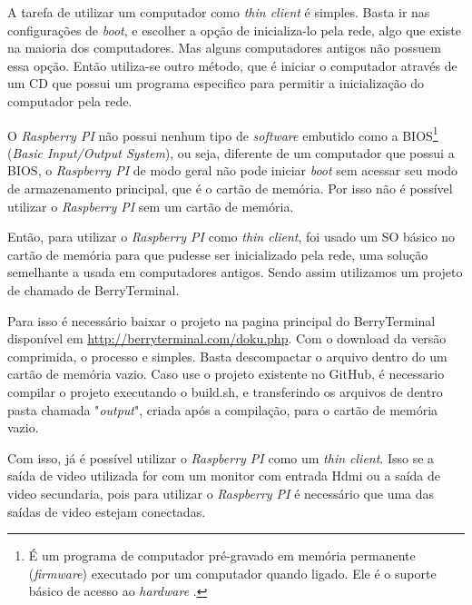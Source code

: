 \documentclass[
	12pt,				%
	openright,			%
	twoside,			%
	a4paper,			%
	chapter=TITLE,		%
	english,			%
	brazil				%
	]{abntex2}
\begin{document}
A tarefa de utilizar um computador como \textit{thin client} é simples. Basta ir nas configurações de \textit{boot}, e escolher a opção de inicializa-lo pela rede, algo que existe na maioria dos computadores. Mas alguns computadores antigos não possuem essa opção. Então utiliza-se outro método, que é iniciar o computador através de um CD que possui um programa especifico para permitir a inicialização do computador pela rede.

O \textit{Raspberry PI} não possui nenhum tipo de \textit{software} embutido como a BIOS\footnote{É um programa de computador pré-gravado em memória permanente (\textit{firmware}) executado por um computador quando ligado. Ele é o suporte básico de acesso ao \textit{hardware} \cite{bios}.} (\textit{Basic Input/Output System}), ou seja, diferente de um computador que possui a BIOS, o \textit{Raspberry PI} de modo geral não pode iniciar \textit{boot} sem acessar seu modo de armazenamento principal, que é o cartão de memória. Por isso não é possível utilizar o \textit{Raspberry PI} sem um cartão de memória.

	Então, para utilizar o \textit{Raspberry PI} como \textit{thin client}, foi usado um SO básico no cartão de memória para que pudesse ser inicializado pela rede, uma solução semelhante a usada em computadores antigos. Sendo assim utilizamos um projeto de chamado de BerryTerminal. 
	
Para isso é necessário baixar o projeto na pagina principal do BerryTerminal  disponível em \url{http://berryterminal.com/doku.php}. Com o download da versão comprimida, o processo e simples. Basta descompactar o arquivo dentro do um cartão de memória vazio. Caso use o projeto existente no GitHub, é necessario compilar o projeto executando o build.sh, e transferindo os arquivos de dentro pasta chamada "\textit{output}", criada após a compilação, para o cartão de memória vazio.

Com isso, já é possível utilizar o \textit{Raspberry PI} como um \textit{thin client}. Isso se a saída de video utilizada for com um monitor com entrada Hdmi ou a saída de video secundaria, pois para utilizar o \textit{Raspberry PI} é necessário que uma das saídas de video estejam conectadas.
\end{document}
